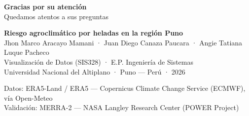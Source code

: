 \documentclass[aspectratio=169,11pt]{beamer}
\begin{document}
\begin{frame}[plain]
  \vfill
  \begin{center}
    {\LARGE\bfseries\textcolor{pnAccent}{Gracias por su atención}}\\[0.9em]
    {\small\textcolor{pnInkSoft}{Quedamos atentos a sus preguntas}}\\[1.4em]

    \colorbox{pnBrandSoft}{\parbox{0.80\textwidth}{\centering\footnotesize
      \textbf{Riesgo agroclimático por heladas en la región Puno}\\[0.3em]
      Jhon Marco Aracayo Mamani · Juan Diego Canaza Paucara · Angie Tatiana Luque Pacheco\\[0.4em]
      {\scriptsize Visualización de Datos (SIS328) · E.P. Ingeniería de Sistemas\\
      Universidad Nacional del Altiplano · Puno — Perú · 2026}
    }}

    \vspace{1.0em}
    {\tiny\textcolor{pnInkSoft}{Datos: ERA5-Land / ERA5 — Copernicus Climate Change Service (ECMWF),
    vía Open-Meteo\\
    Validación: MERRA-2 — NASA Langley Research Center (POWER Project)}}
  \end{center}
  \vfill
\end{frame}
\end{document}
